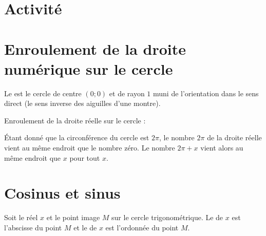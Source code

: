 
\section{Activité}



\section{Enroulement de la droite numérique sur le cercle}


\begin{definition}
    Le  est le cercle de centre \( (0;0)\) et de rayon \( 1\) muni de l'orientation dans le sens direct (le sens inverse des aiguilles d'une montre).
\end{definition}

Enroulement de la droite réelle sur le cercle :
\begin{center}
   
\end{center}

Étant donné que la circonférence du cercle est \( 2\pi\), le nombre \( 2\pi\) de la droite réelle vient au même endroit que le nombre zéro. Le nombre \( 2\pi+x\) vient alors au même endroit que \( x\) pour tout \( x\).

\section{Cosinus et sinus}

\begin{definition}
    Soit le réel \( x\) et le point image \( M\) sur le cercle trigonométrique. Le  de \( x\) est l'abscisse du point \( M\) et le  de \(x\) est l'ordonnée du point \( M\).
\end{definition}

